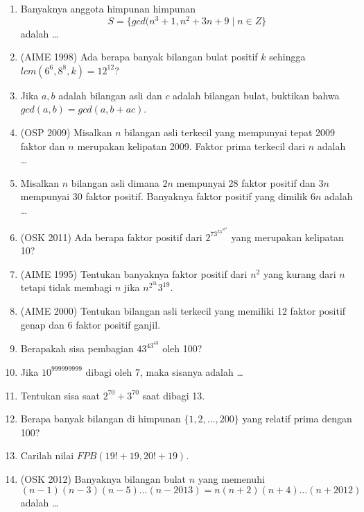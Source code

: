 \documentclass[11pt]{scrartcl}
\begin{document}
\begin{enumerate}
        \item Banyaknya anggota himpunan himpunan 
        $$S = \{gcd(n^3+1,n^2+3n+9 \mid n \in Z\}$$
        adalah \dots
        
        \item (AIME 1998) Ada berapa banyak bilangan bulat positif $k$ sehingga $lcm(6^6,8^8,k)=12^{12}$?
        
        \item Jika $a,b$ adalah bilangan asli dan $c$ adalah bilangan bulat, buktikan bahwa $gcd(a,b)=gcd(a,b+ac).$
        
        \item (OSP 2009) Misalkan $n$ bilangan asli terkecil yang mempunyai tepat 2009 faktor dan $n$ merupakan kelipatan 2009. Faktor prima terkecil dari $n$ adalah \dots
        
        \item Misalkan $n$ bilangan asli dimana $2n$ mempunyai 28 faktor positif dan $3n$ mempunyai 30 faktor positif. Banyaknya faktor positif yang dimilik $6n$ adalah \dots
        
        \item (OSK 2011) Ada berapa faktor positif dari $2^73^55^37^2$ yang merupakan kelipatan 10?
        
        \item (AIME 1995) Tentukan banyaknya faktor positif dari $n^2$ yang kurang dari $n$ tetapi tidak membagi $n$ jika $n^{2^{31}}3^{19}.$
        
        \item (AIME 2000) Tentukan bilangan asli terkecil yang memiliki 12 faktor positif genap dan $6$ faktor positif ganjil.
        
        \item Berapakah sisa pembagian $43^{43^{43}}$ oleh 100?
        
        \item Jika $10^{999999999}$ dibagi oleh 7, maka sisanya adalah \dots
        
        \item Tentukan sisa saat $2^{70}+3^{70}$ saat dibagi 13.
        
        \item Berapa banyak bilangan di himpunan $\{1,2,\dots,200\}$ yang relatif prima dengan 100?
        
        \item Carilah nilai $FPB(19!+19,20!+19).$
        
        \item (OSK 2012) Banyaknya bilangan bulat $n$ yang memenuhi $$(n-1)(n-3)(n-5)\dots(n-2013)=n(n+2)(n+4)\dots (n+2012)$$ adalah \dots
            

\end{enumerate}
\end{document}
